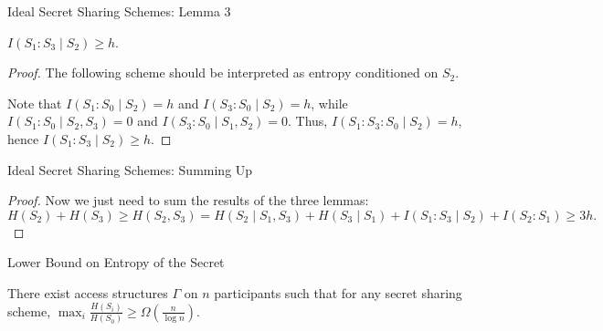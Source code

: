 \documentclass[aspectratio=169]{beamer}
\begin{document}
\begin{frame}{Ideal Secret Sharing Schemes: Lemma 3}
    \begin{lemma}\label{lm:secret4:l3}
        $I(S_1 : S_3 \mid S_2) \ge h$.
    \end{lemma}

    \begin{proof}
        The following scheme should be interpreted as entropy conditioned on $S_2$.
        \begin{center}
        \end{center}
        Note that $I(S_1 : S_0 \mid S_2) = h$ and $I(S_3 : S_0 \mid S_2) = h$, while
        $I(S_1 : S_0 \mid S_2, S_3) = 0$ and $I(S_3 : S_0 \mid S_1, S_2) = 0$.
        Thus, $I(S_1 : S_3 : S_0 \mid S_2) = h$, hence $I(S_1 : S_3 \mid S_2) \ge h$.
    \end{proof}
\end{frame}

\begin{frame}{Ideal Secret Sharing Schemes: Summing Up}
   \begin{proof}
            Now we just need to sum the results of the three lemmas:
        \[
        H(S_2) + H(S_3) \ge H(S_2, S_3) = H(S_2 \mid S_1, S_3) + H(S_3 \mid S_1) + I(S_1 : S_3 \mid S_2) +
        I(S_2 : S_1) \ge 3h.
        \]
  \end{proof}
\end{frame}


\begin{frame}{Lower Bound on Entropy of the Secret}
    \begin{theorem}[Csirmaz'94]
        There exist access structures $\Gamma$ on $n$ participants such that for any secret sharing scheme,
        $\max_i \frac{H(S_i)}{H(S_0)} \ge \Omega\left(\frac{n}{\log n}\right)$.
    \end{theorem}
\end{frame}
\end{document}
